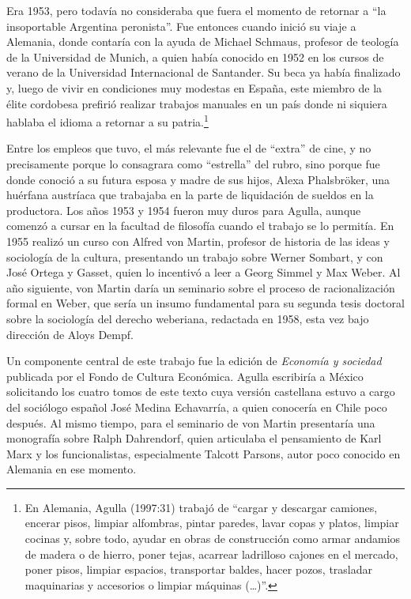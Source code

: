 Era 1953, pero todavía no consideraba que fuera el momento de retornar a \enquote{la insoportable Argentina peronista}. Fue entonces cuando inició su viaje a Alemania, donde contaría con la ayuda de Michael Schmaus, profesor de teología de la Universidad de Munich, a quien había conocido en 1952 en los cursos de verano de la Universidad Internacional de Santander. Su beca ya había finalizado y, luego de vivir en condiciones muy modestas en España, este miembro de la élite cordobesa prefirió realizar trabajos manuales en un país donde ni siquiera hablaba el idioma a retornar a su patria.\footnote{En Alemania, Agulla (1997:31) trabajó de \enquote{cargar y descargar camiones, encerar pisos, limpiar alfombras, pintar paredes, lavar copas y platos, limpiar cocinas y, sobre todo, ayudar en obras de construcción como armar andamios de madera o de hierro, poner tejas, acarrear ladrilloso cajones en el mercado, poner pisos, limpiar espacios, transportar baldes, hacer pozos, trasladar maquinarias y accesorios o limpiar máquinas (\dots)}.}

Entre los empleos que tuvo, el más relevante fue el de \enquote{extra} de cine, y no precisamente porque lo consagrara como \enquote{estrella} del rubro, sino porque fue donde conoció a su futura esposa y madre de sus hijos, Alexa Phalsbröker, una huérfana austríaca que trabajaba en la parte de liquidación de sueldos en la productora. Los años 1953 y 1954 fueron muy duros para Agulla, aunque comenzó a cursar en la facultad de filosofía cuando el trabajo se lo permitía. En 1955 realizó un curso con Alfred von Martin, profesor de historia de las ideas y sociología de la cultura, presentando un trabajo sobre Werner Sombart, y con José Ortega y Gasset, quien lo incentivó a leer a Georg Simmel y Max Weber. Al año siguiente, von Martin daría un seminario sobre el proceso de racionalización formal en Weber, que sería un insumo fundamental para su segunda tesis doctoral sobre la sociología del derecho weberiana, redactada en 1958, esta vez bajo dirección de Aloys Dempf.

Un componente central de este trabajo fue la edición de \emph{Economía y sociedad} publicada por el Fondo de Cultura Económica. Agulla escribiría a México solicitando los cuatro tomos de este texto cuya versión castellana estuvo a cargo del sociólogo español José Medina Echavarría, a quien conocería en Chile poco después. Al mismo tiempo, para el seminario de von Martin presentaría una monografía sobre Ralph Dahrendorf, quien articulaba el pensamiento de Karl Marx y los funcionalistas, especialmente Talcott Parsons, autor poco conocido en Alemania en ese momento.

